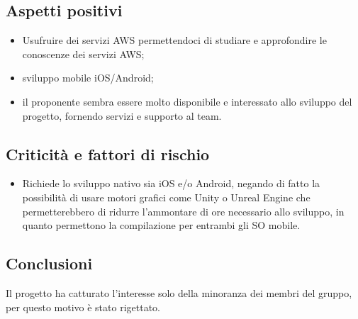 \subsection{Aspetti positivi}
\begin{itemize}
    \item Usufruire dei servizi AWS permettendoci di studiare e approfondire le conoscenze dei servizi AWS;
    \item sviluppo mobile iOS/Android;
    \item il proponente sembra essere molto disponibile e interessato allo sviluppo del progetto, fornendo servizi e supporto al team.
\end{itemize}
\subsection{Criticità e fattori di rischio}
\begin{itemize}
    \item Richiede lo sviluppo nativo sia iOS e/o Android, negando di fatto la possibilità di usare motori grafici come Unity o Unreal Engine che permetterebbero di ridurre l'ammontare di ore necessario allo sviluppo, in quanto permettono la compilazione per entrambi gli SO mobile.
\end{itemize}
\subsection{Conclusioni}
Il progetto ha catturato l'interesse solo della minoranza dei membri del gruppo, per questo motivo è stato rigettato.